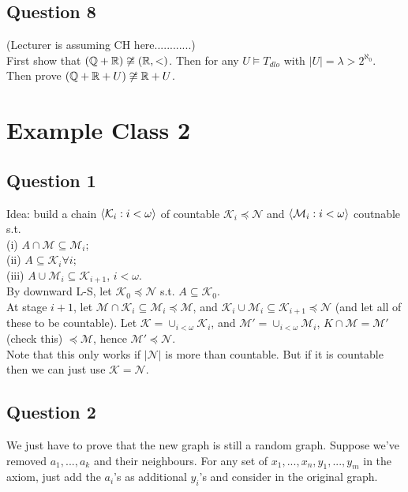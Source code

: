 \documentclass[a4paper]{article}
\begin{document}
\subsection{Question 8}
(Lecturer is assuming CH here............)\\
First show that $(\mathbb{Q}+\mathbb{R}) \not\cong (\mathbb{R},<)$. Then for any $U \vDash T_{dlo}$ with $|U| = \lambda > 2^{\aleph_0}$. Then prove $(\mathbb{Q}+\mathbb{R}+U) \not\cong \mathbb{R}+U$.

\newpage

\section{Example Class 2}

\subsection{Question 1}
Idea: build a chain $\langle \mathcal{K}_i:i < \omega\rangle$ of countable $\mathcal{K}_i \preccurlyeq \mathcal{N}$ and $\langle \mathcal{M}_i : i < \omega \rangle$ coutnable s.t. \\
(i) $A \cap \mathcal{M} \subseteq \mathcal{M}_i$;\\
(ii) $A \subseteq \mathcal{K}_i \forall i$;\\
(iii) $A \cup \mathcal{M}_i \subseteq \mathcal{K}_{i+1}$, $i < \omega$.\\
By downward L-S, let $\mathcal{K}_0 \preccurlyeq \mathcal{N}$ s.t. $A \subseteq \mathcal{K}_0$.\\
At stage $i+1$, let $\mathcal{M} \cap \mathcal{K}_i \subseteq \mathcal{M}_i \preccurlyeq\mathcal{M}$, and $\mathcal{K}_i \cup \mathcal{M}_i \subseteq \mathcal{K}_{i+1} \preccurlyeq \mathcal{N}$ (and let all of these to be countable).
Let $\mathcal{K} = \cup_{i < \omega} \mathcal{K}_i$, and $\mathcal{M}' = \cup_{i < \omega} \mathcal{M}_i$, $K \cap \mathcal{M} = \mathcal{M}'$ (check this) $\preccurlyeq \mathcal{M}$, hence $\mathcal{M}' \preccurlyeq \mathcal{N}$.\\
Note that this only works if $|\mathcal{N}|$ is more than countable. But if it is countable then we can just use $\mathcal{K} = \mathcal{N}$.

\subsection{Question 2}
We just have to prove that the new graph is still a random graph. Suppose we've removed $a_1,...,a_k$ and their neighbours. For any set of $x_1,...,x_n,y_1,...,y_m$ in the axiom, just add the $a_i$'s as additional $y_i$'s and consider in the original graph.
\end{document}

